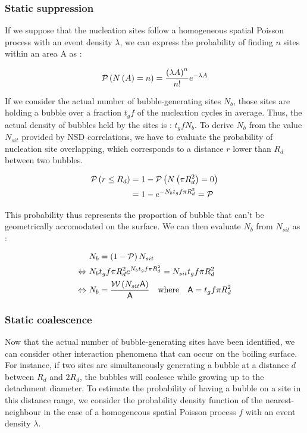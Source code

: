 \subsubsection{Static suppression}

If we suppose that the nucleation sites follow a homogeneous spatial Poisson process with an event density $\lambda$, we can express the probability of finding $n$ sites within an area A as :

\begin{align}
\mathcal{P}\left( N\left( A \right)=n \right)=\frac{\left( \lambda A \right)^{n}}{n!}e^{-\lambda A}
\end{align}

If we consider the actual number of bubble-generating sites $N_{b}$, those sites are holding a bubble over a fraction $t_{g}f$ of the nucleation cycles in average. Thus, the actual density of bubbles held by the sites is : $t_{g}f N_{b}$. To derive $N_{b}$ from the value $N_{sit}$ provided by NSD correlations, we have to evaluate the probability of nucleation site overlapping, which corresponds to a distance $r$ lower than $R_{d}$ between two bubbles. 

\begin{align}
\mathcal{P}\left( r\leq R_{d} \right) &=1-\mathcal{P}\left( N\left( \pi R_{d}^{2} \right)=0 \right)\\
&=1-e^{-N_{b}t_{g}f\pi R_{d}^{2}} = \mathcal{P}
\end{align}

This probability thus represents the proportion of bubble that can't be geometrically accomodated on the surface. We can then evaluate $N_{b}$ from $N_ {sit}$ as :

\begin{align}
&N_{b}=\parth{1-\mathcal{P}}N_{sit} \\
%
\Leftrightarrow\  &N_{b}t_{g}f\pi R_{d}^{2}e^{N_{b}t_{g}f \pi R_{d}^{2}}= N_{sit}t_{g}f \pi R_{d}^{2} \\
%
\Leftrightarrow\   &N_{b} = \frac{\mathcal{W}\parth{N_{sit}\mathsf{A}}}{\mathsf{A}}\ \ \ \text{where}\ \ \ \mathsf{A}=t_{g}f\pi R_{d}^{2}
\end{align}



\subsubsection{Static coalescence}

Now that the actual number of bubble-generating sites have been identified, we can consider other interaction phenomena that can occur on the boiling surface. For instance, if two sites are simultaneously generating a bubble at a distance $d$ between $R_{d}$ and $2R_{d}$, the bubbles will coalesce while growing up to the detachment diameter. To estimate the probability of having a bubble on a site in this distance range, we consider the probability density function of the nearest-neighbour in the case of a homogeneous spatial Poisson process $f$ with an event density $\lambda$. 

